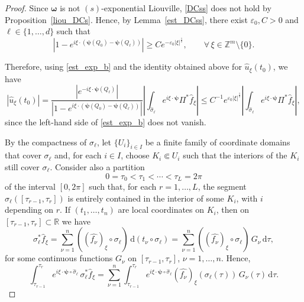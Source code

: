 \documentclass[11pt,reqno]{amsart}
\numberwithin{equation}{section}
\begin{document}
\begin{proof}
		Since \(\boldsymbol{\omega}\) is not \((s)\)-exponential Liouville, \eqref{DCss} does not hold by Proposition~\ref{liou_DCs}.
		Hence, by Lemma~\ref{est_DCss}, there exist \(\varepsilon_0, C>0\) and \(\ell\in\{1,\dots,d\}\) such that
		\begin{equation}\label{est_exp_b}
			|1-e^{i\xi\cdot(\boldsymbol{\psi}(Q_0)-\boldsymbol{\psi}(Q_\ell))}|
			\geq
			C e^{-\varepsilon_0|\xi|^{\frac{1}{s}}},
			\qquad\forall\,\xi\in\mathbb{Z}^m\setminus\{0\}.
		\end{equation}
		
		Therefore, using \eqref{est_exp_b} and the identity obtained above for \(\widehat{u}_\xi(t_0)\), we have
		\begin{equation*}
			|\widehat{u}_\xi(t_0)|
			=
			\dfrac{|e^{-i\xi\cdot\boldsymbol{\psi}(Q_\ell)}|}
			{|1-e^{i\xi\cdot(\boldsymbol{\psi}(Q_0)-\boldsymbol{\psi}(Q_\ell))}|}
			\left|\int_{\hat\sigma_\ell}e^{i\xi\cdot\boldsymbol{\psi}}\Pi^*\widehat{f}_\xi\right|
			\leq
			C^{-1}e^{\varepsilon_0|\xi|^{\frac{1}{s}}}
			\left|\int_{\hat\sigma_\ell}e^{i\xi\cdot\boldsymbol{\psi}}\Pi^*\widehat{f}_\xi\right|,
		\end{equation*}
		since the left-hand side of \eqref{est_exp_b} does not vanish.
		
		By the compactness of \(\sigma_\ell\), let \(\{U_i\}_{i\in I}\) be a finite family of coordinate domains that cover \(\sigma_\ell\) and, for each \(i\in I\), choose \(K_i\Subset U_i\) such that the interiors of the \(K_i\) still cover \(\sigma_\ell\).
		Consider also a partition
		\[
		0=\tau_0<\tau_1<\cdots<\tau_L=2\pi
		\]
		of the interval \([0,2\pi]\) such that, for each \(r=1,\dots,L\), the segment \(\sigma_\ell([\tau_{r-1},\tau_r])\) is entirely contained in the interior of some \(K_i\), with \(i\) depending on \(r\).
		If \((t_1,\dots,t_n)\) are local coordinates on \(K_i\), then on \([\tau_{r-1},\tau_r]\subset\mathbb{R}\) we have
		\[
		\sigma_\ell^*\widehat{f}_\xi = \sum_{\nu=1}^{n}((\widehat{f_\nu})_\xi\circ\sigma_\ell) \, \mathrm{d}(t_\nu\circ\sigma_\ell)
		= \sum_{\nu=1}^{n}((\widehat{f_\nu})_\xi\circ\sigma_\ell)\,G_\nu\,\mathrm{d}\tau,
		\]
		for some continuous functions \(G_\nu\) on \([\tau_{r-1},\tau_r]\), $\nu=1,\dots,n$.
		Hence,
		\[
		\int_{\tau_{r-1}}^{\tau_r} 	\textbf{\(e^{i\xi\cdot\boldsymbol{\psi} \circ\hat\sigma_\ell}\)} \,\sigma_\ell^*\widehat{f}_\xi
		= \sum_{\nu=1}^{n}\int_{\tau_{r-1}}^{\tau_r} 		e^{i\xi\cdot\boldsymbol{\psi} \circ\hat\sigma_\ell} (\widehat{f_\nu})_\xi(\sigma_\ell(\tau)) \,G_\nu(\tau)\,\mathrm{d}\tau.
		\]
		

\end{proof}
\end{document}
